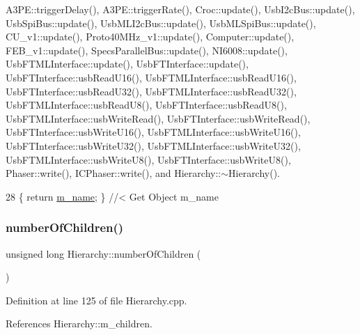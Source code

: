 A3\+P\+E\+::trigger\+Delay(), A3\+P\+E\+::trigger\+Rate(), Croc\+::update(), Usb\+I2c\+Bus\+::update(), Usb\+Spi\+Bus\+::update(), Usb\+M\+L\+I2c\+Bus\+::update(), Usb\+M\+L\+Spi\+Bus\+::update(), C\+U\+\_\+v1\+::update(), Proto40\+M\+Hz\+\_\+v1\+::update(), Computer\+::update(), F\+E\+B\+\_\+v1\+::update(), Specs\+Parallel\+Bus\+::update(), N\+I6008\+::update(), Usb\+F\+T\+M\+L\+Interface\+::update(), Usb\+F\+T\+Interface\+::update(), Usb\+F\+T\+Interface\+::usb\+Read\+U16(), Usb\+F\+T\+M\+L\+Interface\+::usb\+Read\+U16(), Usb\+F\+T\+Interface\+::usb\+Read\+U32(), Usb\+F\+T\+M\+L\+Interface\+::usb\+Read\+U32(), Usb\+F\+T\+M\+L\+Interface\+::usb\+Read\+U8(), Usb\+F\+T\+Interface\+::usb\+Read\+U8(), Usb\+F\+T\+M\+L\+Interface\+::usb\+Write\+Read(), Usb\+F\+T\+Interface\+::usb\+Write\+Read(), Usb\+F\+T\+Interface\+::usb\+Write\+U16(), Usb\+F\+T\+M\+L\+Interface\+::usb\+Write\+U16(), Usb\+F\+T\+Interface\+::usb\+Write\+U32(), Usb\+F\+T\+M\+L\+Interface\+::usb\+Write\+U32(), Usb\+F\+T\+M\+L\+Interface\+::usb\+Write\+U8(), Usb\+F\+T\+Interface\+::usb\+Write\+U8(), Phaser\+::write(), I\+C\+Phaser\+::write(), and Hierarchy\+::$\sim$\+Hierarchy().


\begin{DoxyCode}
28 \{ \textcolor{keywordflow}{return} \hyperlink{classObject_a8b83c95c705d2c3ba0d081fe1710f48d}{m\_name}; \} \textcolor{comment}{//< Get Object m\_name}
\end{DoxyCode}
\mbox{\label{classHierarchy_ab16e84de65fd84e14001a6cf941c8be4}} 
\subsubsection{\texorpdfstring{number\+Of\+Children()}{numberOfChildren()}}
{\footnotesize\ttfamily unsigned long Hierarchy\+::number\+Of\+Children (\begin{DoxyParamCaption}{ }\end{DoxyParamCaption})\hspace{0.3cm}{\ttfamily [inherited]}}



Definition at line 125 of file Hierarchy.\+cpp.



References Hierarchy\+::m\+\_\+children.



